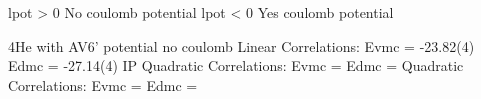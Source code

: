 lpot > 0 No coulomb potential
lpot < 0 Yes coulomb potential

4He with AV6' potential no coulomb
Linear Correlations:
Evmc  =  -23.82(4)
Edmc  =  -27.14(4)
IP Quadratic Correlations:
Evmc  =  
Edmc  =  
Quadratic Correlations:
Evmc  =  
Edmc  =  
